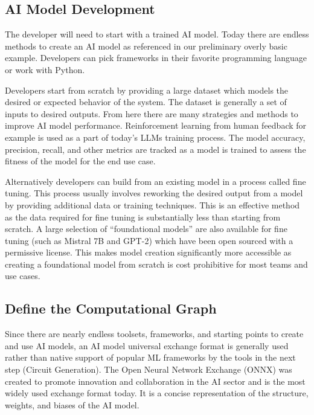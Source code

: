 \documentclass[conference]{IEEEtran}
\begin{document}
\subsection{AI Model Development}
The developer will need to start with a trained AI model. Today there are endless methods to create an AI model as referenced in our preliminary overly basic example.  Developers can pick frameworks in their favorite programming language or work with Python.

Developers start from scratch by providing a large dataset which models the desired or expected behavior of the system. The dataset is generally a set of inputs to desired outputs. From here there are many strategies and methods to improve AI model performance. Reinforcement learning from human feedback for example is used as a part of today’s LLMs training process. The model accuracy, precision, recall, and other metrics are tracked as a model is trained to assess the fitness of the model for the end use case. 

Alternatively developers can build from an existing model in a process called fine tuning. This process usually involves reworking the desired output from a model by providing additional data or training techniques. This is an effective method as the data required for fine tuning is substantially less than starting from scratch. A large selection of “foundational models” are also available for fine tuning (such as Mistral 7B and GPT-2) which have been open sourced with a permissive license. This makes model creation significantly more accessible as creating a foundational model from scratch is cost prohibitive for most teams and use cases.

\subsection{Define the Computational Graph}
Since there are nearly endless toolsets, frameworks, and starting points to create and use AI models, an AI model universal exchange format is generally used rather than native support of popular ML frameworks by the tools in the next step (Circuit Generation). The Open Neural Network Exchange (ONNX) was created to promote innovation and collaboration in the AI sector and is the most widely used exchange format today. It is a concise representation of the structure, weights, and biases of the AI model.
\end{document}
